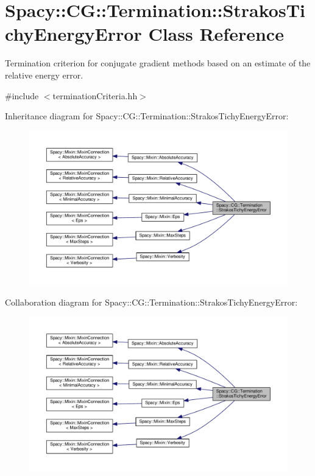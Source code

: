 \hypertarget{classSpacy_1_1CG_1_1Termination_1_1StrakosTichyEnergyError}{}\section{Spacy\+:\+:C\+G\+:\+:Termination\+:\+:Strakos\+Tichy\+Energy\+Error Class Reference}
\label{classSpacy_1_1CG_1_1Termination_1_1StrakosTichyEnergyError}


Termination criterion for conjugate gradient methods based on an estimate of the relative energy error.  




{\ttfamily \#include $<$termination\+Criteria.\+hh$>$}



Inheritance diagram for Spacy\+:\+:C\+G\+:\+:Termination\+:\+:Strakos\+Tichy\+Energy\+Error\+:\nopagebreak
\begin{figure}[H]
\begin{center}
\leavevmode
\includegraphics[width=350pt]{classSpacy_1_1CG_1_1Termination_1_1StrakosTichyEnergyError__inherit__graph}
\end{center}
\end{figure}


Collaboration diagram for Spacy\+:\+:C\+G\+:\+:Termination\+:\+:Strakos\+Tichy\+Energy\+Error\+:\nopagebreak
\begin{figure}[H]
\begin{center}
\leavevmode
\includegraphics[width=350pt]{classSpacy_1_1CG_1_1Termination_1_1StrakosTichyEnergyError__coll__graph}
\end{center}
\end{figure}
